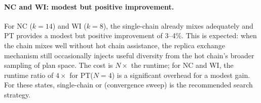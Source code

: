 \paragraph{NC and WI: modest but positive improvement.}
For NC ($k=14$) and WI ($k=8$), the single-chain \fr{} already mixes
adequately and PT provides a modest but positive improvement of 3--4\%.
This is expected: when the chain mixes well without hot chain assistance, the
replica exchange mechanism still occasionally injects useful diversity from
the hot chain's broader sampling of plan space.
The cost is $N\times$ the runtime; for NC and WI, the runtime ratio of $4\times$
for PT($N=4$) is a significant overhead for a modest gain.
For these states, single-chain \fr{} or \cs{} (convergence sweep) is the
recommended search strategy.
